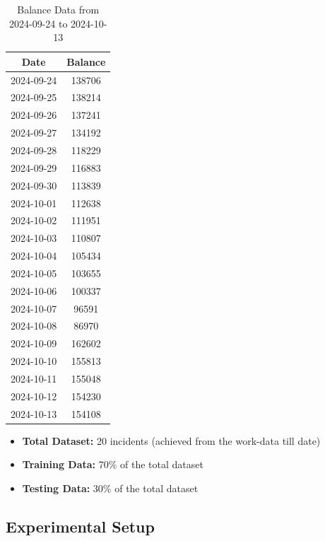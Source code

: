 \documentclass[12pt]{book} %
\begin{document}
\begin{table}[h!]
    \centering
    \begin{tabular}{|c|c|}
        \hline
        \textbf{Date} & \textbf{Balance} \\ \hline
        2024-09-24 & 138706 \\ \hline
        2024-09-25 & 138214 \\ \hline
        2024-09-26 & 137241 \\ \hline
        2024-09-27 & 134192 \\ \hline
        2024-09-28 & 118229 \\ \hline
        2024-09-29 & 116883 \\ \hline
        2024-09-30 & 113839 \\ \hline
        2024-10-01 & 112638 \\ \hline
        2024-10-02 & 111951 \\ \hline
        2024-10-03 & 110807 \\ \hline
        2024-10-04 & 105434 \\ \hline
        2024-10-05 & 103655 \\ \hline
        2024-10-06 & 100337 \\ \hline
        2024-10-07 & 96591 \\ \hline
        2024-10-08 & 86970 \\ \hline
        2024-10-09 & 162602 \\ \hline
        2024-10-10 & 155813 \\ \hline
        2024-10-11 & 155048 \\ \hline
        2024-10-12 & 154230 \\ \hline
        2024-10-13 & 154108 \\ \hline
    \end{tabular}
    \caption{Balance Data from 2024-09-24 to 2024-10-13}
    \label{tab:balance_data}
\end{table}


\begin{itemize}
    \item \textbf{Total Dataset:} 20 incidents (achieved from the work-data till date)
    \item \textbf{Training Data:} 70\% of the total dataset
    \item \textbf{Testing Data:} 30\% of the total dataset
\end{itemize}

\subsection{Experimental Setup}
\end{document}
